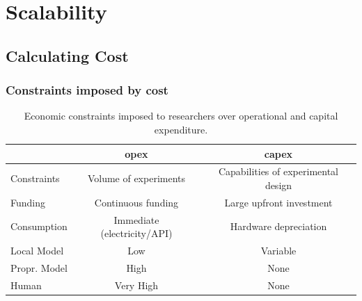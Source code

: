 %
\section{Scalability}
\label{sec:scalability}

\subsection{Calculating Cost}
\label{sec:scalability:cost}

\subsubsection{Constraints imposed by cost}
\label{sec:scalability:cost:sources}

\begin{table}[ht]
	\centering
	\caption{Economic constraints imposed to researchers over operational and capital expenditure.}
	\label{tab:cost-sources}
	\begin{tabular}{lcc}
		\toprule
		& \textbf{\ac{opex}} & \textbf{\ac{capex}} \\
		\midrule
		Constraints & Volume of experiments & Capabilities of experimental design \\
		Funding & Continuous funding & Large upfront investment \\
		Consumption & Immediate (electricity/API) & Hardware depreciation \\
		Local Model & Low & Variable \\
		Propr. Model & High & None \\
		Human & Very High & None \\
		\bottomrule
	\end{tabular}
\end{table}



